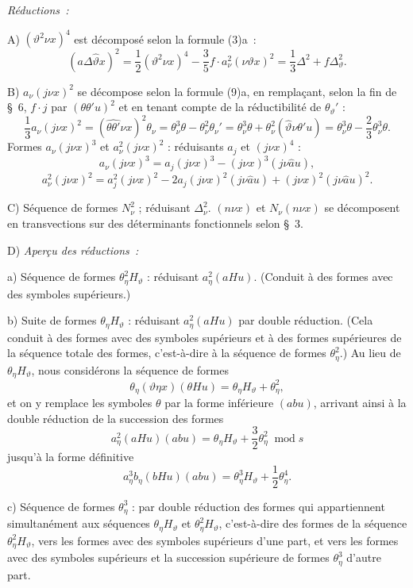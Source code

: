 \documentclass[11pt]{article}
\newcommand{\A}{\Delta}
\newcommand{\modu}[1]{\;\operatorname{mod} #1}
\providecommand{\modu}[1]{\;\operatorname{mod} #1}
\begin{document}
\noindent\emph{Réductions :}

\noindent A) $(\vartheta^2\nu x)^4$ est décomposé selon la formule (3)a :
\[
(a\A\widehat{\vartheta}x)^2=\frac12(\vartheta^2\nu x)^4-\frac35 f\cdot a_\nu^2(\nu\vartheta x)^2
=\frac13\A^2+f\A_\vartheta^2.
\]

\noindent B) $a_\nu(j\nu x)^2$ se décompose selon la formule (9)a, en remplaçant, selon la fin de \S\ 6, $f\cdot j$ par $(\theta\theta'u)^2$ et en tenant compte de la réductibilité de $\theta_\vartheta'$ :
\[
\frac13a_\nu(j\nu x)^2=(\widehat{\theta\theta'}\nu x)^2\theta_\nu
=\theta_\nu^3\theta-\theta_\nu^2\theta_\nu'
=\theta_\nu^3\theta+\theta_\nu^2(\widehat{\vartheta}\nu\theta'u)
=\theta_\nu^3\theta-\frac23\theta_\nu^3\theta.
\]
Formes $a_\nu(j\nu x)^3$ et $a_\nu^2(j\nu x)^2$ : réduisants $a_j$ et $(j\nu x)^4$ :
\[
a_\nu(j\nu x)^3=a_j(j\nu x)^3-(j\nu x)^3(j\nu\widehat{a}u),
\]
\[
a_\nu^2(j\nu x)^2=a_j^2(j\nu x)^2-2a_j(j\nu x)^2(j\nu\widehat{a}u)+(j\nu x)^2(j\nu\widehat{a}u)^2.
\]

\noindent C) Séquence de formes $N_\nu^2$ ; réduisant $\A_\nu^2$. $(n\nu x)$ et $N_\nu(n\nu x)$ se décomposent en transvections sur des déterminants fonctionnels selon \S\ 3.

\noindent D) \emph{Aperçu des réductions :}

a) Séquence de formes $\theta_\eta^2H_\vartheta$ : réduisant $a_\eta^2(aHu)$. (Conduit à des formes avec des symboles supérieurs.)

b) Suite de formes $\theta_\eta H_\vartheta$ : réduisant $a_\eta^2(aHu)$ par double réduction. (Cela conduit à des formes avec des symboles supérieurs et à des formes supérieures de la séquence totale des formes, c'est-à-dire à la séquence de formes $\theta_\eta^2$.) Au lieu de $\theta_\eta H_\vartheta$, nous considérons la séquence de formes
\[
\theta_\eta(\vartheta\eta x)(\theta Hu)=\theta_\eta H_\vartheta+\theta_\eta^2,
\]
et on y remplace les symboles $\theta$ par la forme inférieure $(abu)$, arrivant ainsi à la double réduction de la succession des formes
\[
a_\eta^2(aHu)(abu)=\theta_\eta H_\vartheta+\frac32\theta_\eta^2\modu{s}
\]
jusqu'à la forme définitive
\[
a_\eta^3b_\eta(bHu)(abu)=\theta_\eta^3H_\vartheta+\frac12\theta_\eta^4.
\]

c) Séquence de formes $\theta_\eta^3$ : par double réduction des formes qui appartiennent simultanément aux séquences $\theta_\eta H_\vartheta$ et $\theta_\eta^2H_\vartheta$, c'est-à-dire des formes de la séquence $\theta_\eta^2H_\vartheta$, vers les formes avec des symboles supérieurs d'une part, et vers les formes avec des symboles supérieurs et la succession supérieure de formes $\theta_\eta^3$ d'autre part.
\end{document}
